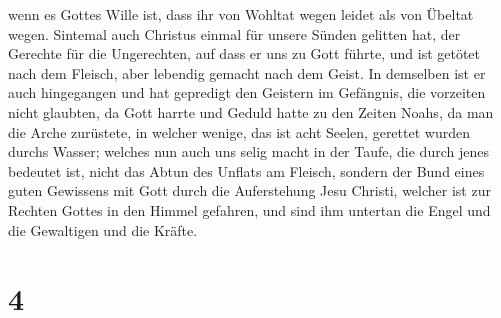 wenn es Gottes Wille ist, dass ihr von Wohltat wegen leidet als von
Übeltat wegen.  Sintemal auch Christus einmal für unsere
Sünden gelitten hat, der Gerechte für die Ungerechten, auf dass er uns
zu Gott führte, und ist getötet nach dem Fleisch, aber lebendig gemacht
nach dem Geist.  In demselben ist er auch hingegangen und
hat gepredigt den Geistern im Gefängnis,  die vorzeiten
nicht glaubten, da Gott harrte und Geduld hatte zu den Zeiten Noahs, da
man die Arche zurüstete, in welcher wenige, das ist acht Seelen,
gerettet wurden durchs Wasser;  welches nun auch uns
selig macht in der Taufe, die durch jenes bedeutet ist, nicht das Abtun
des Unflats am Fleisch, sondern der Bund eines guten Gewissens mit Gott
durch die Auferstehung Jesu Christi,  welcher ist zur
Rechten Gottes in den Himmel gefahren, und sind ihm untertan die Engel
und die Gewaltigen und die Kräfte.

\hypertarget{section-3}{%
\section{4}\label{section-3}}

